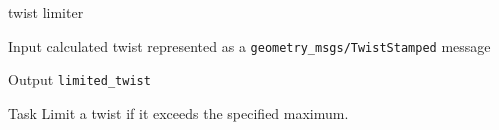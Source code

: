 \begin{frame}{twist limiter}
	\begin{alertblock}{Input}
	calculated twist represented as a \texttt{geometry\_msgs/TwistStamped} message
    \end{alertblock}
    
    \begin{alertblock}{Output}
	\texttt{limited\_twist}
    \end{alertblock}
    
    \begin{alertblock}{Task}
    Limit a twist if it exceeds the specified maximum.
    \end{alertblock}
\end{frame}

